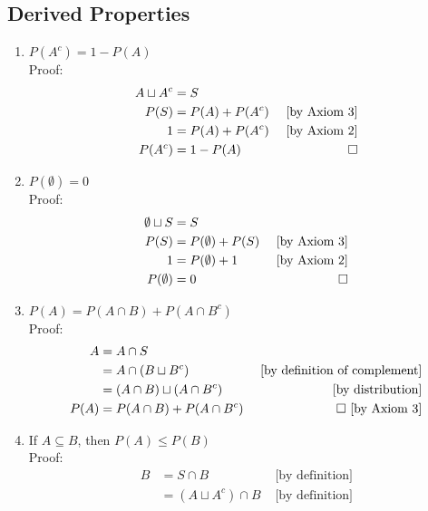 \documentclass[12pt]{article}
\begin{document}
        \subsection{Derived Properties}
            \begin{enumerate}
                \item $P(A^c) = 1 - P(A)$
                \\Proof:
                \begin{align*}
                    A \sqcup A^c &= S \\
                    P(S) &= P(A) + P(A^c) &\text{ [by Axiom 3]}\\
                    1 &= P(A) + P(A^c) &\text{ [by Axiom 2]}\\
                    P(A^c) &= 1 - P(A) &\qed
                \end{align*}
                \item $P(\emptyset) = 0$
                \\Proof:
                \begin{align*}
                    \emptyset \sqcup S &= S \\
                    P(S) &= P(\emptyset) + P(S) &\text{ [by Axiom 3]}\\
                    1 &= P(\emptyset) + 1 &\text{ [by Axiom 2]}\\
                    P(\emptyset) &= 0 &\qed
                \end{align*}
                \item $P(A) = P(A \cap B) + P(A \cap B^c)$
                \\Proof:
                \begin{align*}
                    A &= A \cap S \\
                    &= A \cap (B \sqcup B^c) &\text{ [by definition of complement]}\\
                    &= (A \cap B) \sqcup (A \cap B^c) &\text{ [by distribution]}\\
                    P(A) &= P(A \cap B) + P(A \cap B^c) &\qed \text{ [by Axiom 3]}
                \end{align*}
                \item If $A \subseteq B$, then $P(A) \leq P(B)$
                \\Proof:
                \begin{align*}
                    B &= S \cap B &\text{ [by definition]}\\
                    &= (A \sqcup A^c) \cap B &\text{ [by definition]}\\

\end{align*}
\end{enumerate}
\end{document}
